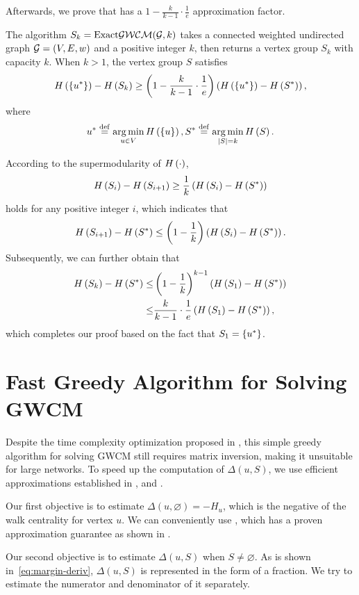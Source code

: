\documentclass[10pt,twocolumn,twoside]{IEEEtran}
\begin{document}
Afterwards, we prove that  has a \(1-\frac{k}{k-1}\cdot\frac{1}{e}\) approximation factor.
\begin{theorem}
    The algorithm \(S_k=\text{Exact}\mathcal{GWCM}(\mathcal{G},k)\) takes a connected weighted undirected graph \(\mathcal{G}=(V,E,w)\) and a positive integer \(k\), then returns a vertex group \(S_k\) with capacity \(k\).
    When \(k>1\), the vertex group \(S\) satisfies
    \[H\left(\left\{u^* \right\}\right)-H\left(S_k\right)\ge\left( 1-\frac{k}{k-1}\cdot\frac{1}{e} \right)\left( H\left(\left\{u^* \right\}\right)-H\left(S^*\right) \right),\]
    where
    \[u^*\stackrel{\mathrm{def}}{=}\operatorname*{arg\,min}_{u\in V}H\left(\left\{u \right\}\right),S^*\stackrel{\mathrm{def}}{=}\operatorname*{arg\,min}_{\left|S \right|=k}H\left(S\right).\]
\end{theorem}
\begin{IEEEproof}
    According to the supermodularity of \(H\left(\cdot\right)\),
    \[H\left(S_i\right)-H\left(S_{i+1}\right)\ge\frac{1}{k}\left( H\left(S_i\right)-H\left(S^*\right) \right)\]
    holds for any positive integer \(i\), which indicates that
    \[H\left(S_{i+1}\right)-H\left(S^*\right)\le\left( 1-\frac{1}{k} \right)\left( H\left(S_i\right)-H\left(S^*\right) \right).\]
    Subsequently, we can further obtain that
    \begin{align*}
        H\left(S_k\right)-H\left(S^*\right)\le & \left( 1-\frac{1}{k} \right)^{k-1}\left( H\left(S_1\right)-H\left(S^*\right) \right)    \\
        \le                      & \frac{k}{k-1}\cdot\frac{1}{e}\left( H\left(S_1\right)-H\left(S^*\right) \right),
    \end{align*}
    which completes our proof based on the fact that \(S_1=\left\{u^* \right\}\).
\end{IEEEproof}

\section{Fast Greedy Algorithm for Solving GWCM}\label{sec:approx-algo2}

Despite the time complexity optimization proposed in , this simple greedy algorithm for solving GWCM still requires matrix inversion, making it unsuitable for large networks.
To speed up the computation of \(\Delta(u,S)\), we use efficient approximations established in ,  and .

Our first objective is to estimate \(\Delta(u,\varnothing)=-H_u\), which is the negative of the walk centrality for vertex \(u\).
We can conveniently use , which has a proven approximation guarantee as shown in .

Our second objective is to estimate \(\Delta(u,S)\) when \(S\neq\varnothing\).
As is shown in~\eqref{eq:margin-deriv}, \(\Delta(u,S)\) is represented in the form of a fraction.
We try to estimate the numerator and denominator of it separately.
\end{document}
